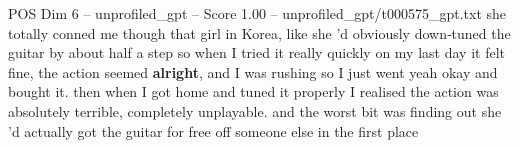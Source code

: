 \begin{textsample}{POS Dim 6 – unprofiled\_gpt – Score 1.00 – unprofiled\_gpt/t000575\_gpt.txt}  \label{ex:f6_pos_021}
she totally conned me though that girl in Korea, like she ’d obviously down‑tuned the guitar by about half a step so when I tried it really quickly on my last day it felt fine, the action seemed \textbf{alright}, and I was rushing so I just went yeah okay and bought it. then when I got home and tuned it properly I realised the action was absolutely terrible, completely unplayable. and the worst bit was finding out she ’d actually got the guitar for free off someone else in the first place

\end{textsample}
